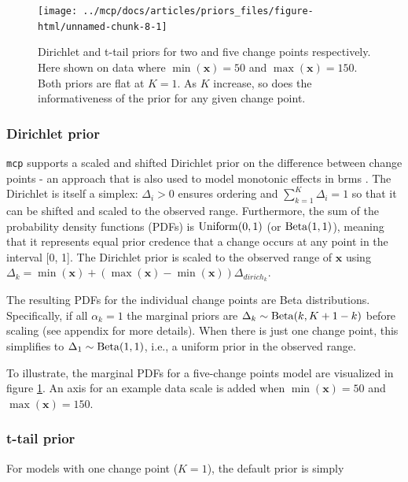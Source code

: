\documentclass[
  american,
]{article}
\begin{document}
\begin{figure}
\texttt{[image: ../mcp/docs/articles/priors\_files/figure-html/unnamed-chunk-8-1]} \caption{Dirichlet and t-tail priors for two and five change points respectively. Here shown on data where \(\min(\mathbf{x}) = 50\) and \(\max(\mathbf{x}) = 150\). Both priors are flat at \(K = 1\). As \(K\) increase, so does the informativeness of the prior for any given change point.}\label{fig:defaultpriors}
\end{figure}

\hypertarget{dirichlet}{%
\subsubsection{Dirichlet prior}\label{dirichlet}}

\texttt{mcp} supports a scaled and shifted Dirichlet prior on the difference between change points - an approach that is also used to model monotonic effects in brms \citep{burkner2018}. The Dirichlet is itself a simplex: \(\Delta_i > 0\) ensures ordering and \(\sum_{k=1}^K \Delta_i = 1\) so that it can be shifted and scaled to the observed range. Furthermore, the sum of the probability density functions (PDFs) is \({\rm Uniform}(0, 1)\) (or \({\rm Beta}(1,1)\)), meaning that it represents equal prior credence that a change occurs at any point in the interval {[}0, 1{]}. The Dirichlet prior is scaled to the observed range of \(\mathbf{x}\) using \(\Delta_k = \min(\mathbf{x}) + (\max(\mathbf{x}) - \min(\mathbf{x})) \Delta_{dirich_k}\).

The resulting PDFs for the individual change points are Beta distributions. Specifically, if all \(\alpha_k = 1\) the marginal priors are \(\Delta_k \sim {\rm Beta}(k, K + 1 - k)\) before scaling (see appendix for more details). When there is just one change point, this simplifies to \(\Delta_1 \sim {\rm Beta}(1, 1)\), i.e., a uniform prior in the observed range.

To illustrate, the marginal PDFs for a five-change points model are visualized in figure \ref{fig:defaultpriors}. An axis for an example data scale is added when \(\min(\mathbf{x}) = 50\) and \(\max(\mathbf{x}) = 150\).

\hypertarget{t-tail}{%
\subsubsection{t-tail prior}\label{t-tail}}

For models with one change point (\(K = 1\)), the default prior is simply
\end{document}
